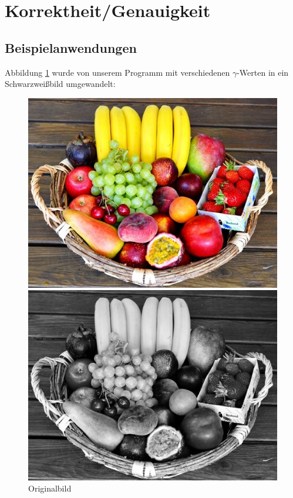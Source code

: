 \documentclass[course=erap]{aspdoc}
\begin{document}
	\section{Korrektheit/Genauigkeit}
	 
	\subsection{Beispielanwendungen}
	Abbildung \ref{Obstkorb} wurde von unserem Programm mit verschiedenen $\gamma$-Werten in ein Schwarzweißbild umgewandelt:
	
	\begin{figure}[h]
		\begin{minipage}{0.49\linewidth}
			\centering
			\includegraphics[scale=1.2]{Images/fruit_basket_original.png}
			\caption{Originalbild \cite{Bildquelle}}
			\label{Obstkorb}
		\end{minipage}
		\centering
		\begin{minipage}{0.49\linewidth}
			\centering
			\includegraphics[scale=1.2]{Images/fruit_basket_gamma_1,25.png}

\end{minipage}
\end{figure}
\end{document}

